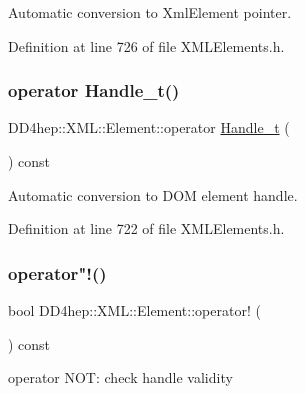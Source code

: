 Automatic conversion to Xml\+Element pointer. 



Definition at line 726 of file X\+M\+L\+Elements.\+h.

\hypertarget{class_d_d4hep_1_1_x_m_l_1_1_element_ae0d9a6dcfa82e3339d7fb1dc7b42ef6d}{}\label{class_d_d4hep_1_1_x_m_l_1_1_element_ae0d9a6dcfa82e3339d7fb1dc7b42ef6d} 
\subsubsection{\texorpdfstring{operator Handle\+\_\+t()}{operator Handle\_t()}}
{\footnotesize\ttfamily D\+D4hep\+::\+X\+M\+L\+::\+Element\+::operator \hyperlink{class_d_d4hep_1_1_x_m_l_1_1_handle__t}{Handle\+\_\+t} (\begin{DoxyParamCaption}{ }\end{DoxyParamCaption}) const\hspace{0.3cm}{\ttfamily [inline]}}



Automatic conversion to D\+OM element handle. 



Definition at line 722 of file X\+M\+L\+Elements.\+h.

\hypertarget{class_d_d4hep_1_1_x_m_l_1_1_element_a2db5e6db2748494610fb5da2b71c5f2f}{}\label{class_d_d4hep_1_1_x_m_l_1_1_element_a2db5e6db2748494610fb5da2b71c5f2f} 
\subsubsection{\texorpdfstring{operator"!()}{operator!()}}
{\footnotesize\ttfamily bool D\+D4hep\+::\+X\+M\+L\+::\+Element\+::operator! (\begin{DoxyParamCaption}{ }\end{DoxyParamCaption}) const\hspace{0.3cm}{\ttfamily [inline]}}



operator N\+OT\+: check handle validity 



